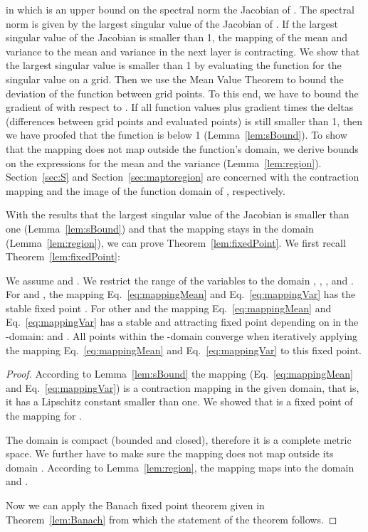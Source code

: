 \documentclass{article}
\begin{document}
in which  is an upper bound on the spectral norm the Jacobian  of .
The spectral norm is given by the largest singular value of the Jacobian of .
If the largest singular value of the Jacobian is smaller than 1, 
the mapping   of the mean and variance to the mean and variance in the next layer is contracting.
We show that the largest singular value is smaller than 1 by
evaluating the function for the singular value
 on a grid.
Then we use the Mean Value Theorem to bound the deviation of the
function  between grid points. 
To this end, we have to bound the gradient of  with respect to
. If all function values plus
gradient times the deltas (differences between grid points and evaluated
points) is still smaller than 1, then we have proofed that the
function is below 1 (Lemma~\ref{lem:sBound}). To show that the mapping does not map outside the function's domain, we 
derive bounds on the expressions for the mean and the variance (Lemma~\ref{lem:region}).
Section~\ref{sec:S} and Section~\ref{sec:maptoregion} are concerned with the contraction mapping and 
the image of the function domain of , respectively.

With the results that the largest singular value of the Jacobian is smaller than 
one (Lemma~\ref{lem:sBound}) and that the mapping stays in the domain 
(Lemma~\ref{lem:region}), we can prove Theorem~\ref{lem:fixedPoint}.
We first recall Theorem~\ref{lem:fixedPoint}:


\begin{theorem*}
We assume  and .
We restrict the range of the variables to the domain
,
,
, and
.
For  and , the mapping  Eq.~\eqref{eq:mappingMean}
and Eq.~\eqref{eq:mappingVar} has the stable
fixed point .
For other  and  the mapping  Eq.~\eqref{eq:mappingMean}
and Eq.~\eqref{eq:mappingVar}  has a stable and
attracting fixed point depending on  in the 
-domain:  and 
.
All points within the -domain converge when
iteratively applying the mapping  Eq.~\eqref{eq:mappingMean}
and Eq.~\eqref{eq:mappingVar} to this fixed point.
\end{theorem*}


\begin{proof} 
According to Lemma~\ref{lem:sBound} the mapping  (Eq.~\eqref{eq:mappingMean} and Eq.~\eqref{eq:mappingVar})
is a contraction mapping in the given
domain, that is, it has a Lipschitz constant smaller than one.
We showed that  is a fixed point of the
mapping for . 

The domain is compact (bounded and closed), therefore it is a  
complete metric space.
We further have to make sure the  mapping  does not map outside its domain .
According to Lemma~\ref{lem:region}, the mapping maps into the domain  and 
. 

Now we can apply the Banach fixed point theorem 
given in Theorem~\ref{lem:Banach} from which the statement of the 
theorem follows.
\end{proof}
\end{document}
